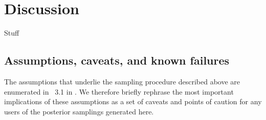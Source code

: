 \documentclass[modern]{aastex63}
\begin{document}





\section{Discussion}

Stuff

\subsection{Assumptions, caveats, and known failures}
\label{sec:caveats}

The assumptions that underlie the sampling procedure described above are
enumerated in \sectionname~3.1 in \cite{Price-Whelan:2018}.
We therefore briefly rephrase the most important implications of these
assumptions as a set of caveats and points of caution for any users of the
posterior samplings generated here.
\end{document}
